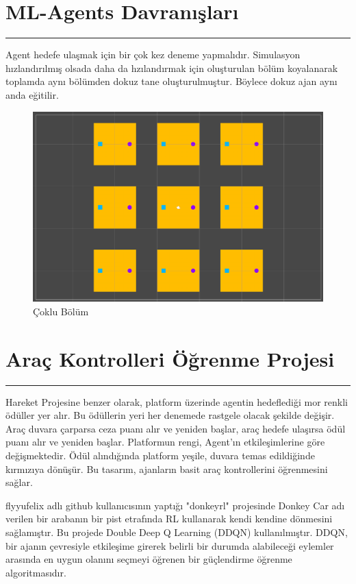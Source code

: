 \documentclass{article}
\begin{document}
\newpage

\section{ML-Agents Davranışları}
\rule{\textwidth}{0.5pt}
Agent hedefe ulaşmak için bir çok kez deneme yapmalıdır. Simulasyon hızlandırılmış olsada daha da hzılandırmak için oluşturulan bölüm koyalanarak toplamda aynı bölümden dokuz tane oluşturulmuştur. Böylece dokuz ajan aynı anda eğitilir. \\[5pt]

\begin{figure}[h]
    \begin{center}
        \includegraphics[width=1.1\textwidth]{coklu_bolum.png}
    \end{center}
      \caption{Çoklu Bölüm}
\end{figure}

\newpage

\section{Araç Kontrolleri Öğrenme Projesi}
\rule{\textwidth}{0.5pt}
\par Hareket Projesine benzer olarak, platform üzerinde agentin hedeflediği mor renkli ödüller yer alır. Bu ödüllerin yeri her denemede rastgele olacak şekilde değişir. Araç duvara çarparsa ceza puanı alır ve yeniden başlar, araç hedefe ulaşırsa ödül puanı alır ve yeniden başlar. Platformun rengi, Agent'ın etkileşimlerine göre değişmektedir. Ödül alındığında platform yeşile, duvara temas edildiğinde kırmızıya dönüşür. Bu tasarım, ajanların basit araç kontrollerini öğrenmesini sağlar.
\newline
\par flyyufelix adlı github kullanıcısının yaptığı "donkeyrl" projesinde\cite{flyyufelix} Donkey Car adı verilen bir arabanın bir pist etrafında RL kullanarak kendi kendine dönmesini sağlamıştır. Bu projede Double Deep Q Learning (DDQN) kullanılmıştır. DDQN, bir ajanın çevresiyle etkileşime girerek belirli bir durumda alabileceği eylemler arasında en uygun olanını seçmeyi öğrenen bir güçlendirme öğrenme algoritmasıdır.\\[15pt]
\end{document}
